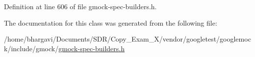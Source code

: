 Definition at line 606 of file gmock-\/spec-\/builders.\+h.



The documentation for this class was generated from the following file\+:\begin{DoxyCompactItemize}
\item 
/home/bhargavi/\+Documents/\+S\+D\+R/\+Copy\+\_\+\+Exam\+\_\+X/vendor/googletest/googlemock/include/gmock/\hyperlink{gmock-spec-builders_8h}{gmock-\/spec-\/builders.\+h}\end{DoxyCompactItemize}
